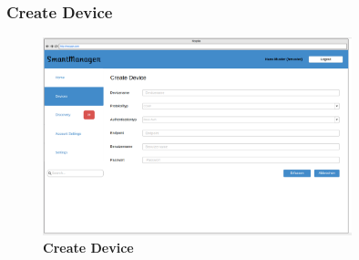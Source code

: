\subsubsection{Create Device}
\begin{figure} [H]
	\begin{center}
	\includegraphics[width=0.80\textwidth]{images/createdevice.png}
	\caption{\textbf{Create Device}}
	\label{Hauptansicht Sessionfinder}
	\end{center}
\end{figure}
